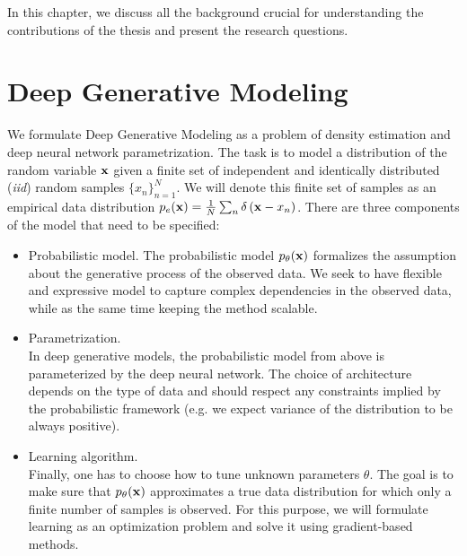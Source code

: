 In this chapter, we discuss all the background crucial for understanding the contributions of the thesis and present the research questions. 


\section{Deep Generative Modeling}
We formulate Deep Generative Modeling as a problem of density estimation and deep neural network parametrization. 
The task is to model a distribution of the random variable ${\mathbf{x}}$ given a finite set of independent and identically distributed (\textit{iid}) random samples $\{x_n\}_{n=1}^N$. 
We will denote this finite set of samples as an empirical data distribution $p_e({\mathbf{x}}) = \frac1N \sum_n \delta\left({\mathbf{x}} - x_n\right)$. 
There are three components of the model that need to be specified:
\begin{itemize}
\item Probabilistic model. \newline 
{}
The probabilistic model $p_{\theta}({\mathbf{x}})$ formalizes the assumption about the generative process of the observed data. 
We seek to have flexible and expressive model to capture complex dependencies in the observed data, while as the same time keeping the method scalable.


\item Parametrization.\\
In deep generative models, the probabilistic model from above is parameterized by the deep neural network. 
The choice of architecture depends on the type of data and should respect any constraints implied by the probabilistic framework (e.g. we expect variance of the distribution to be always positive).

\item Learning algorithm. \\
Finally, one has to choose how to tune unknown parameters $\theta$. The goal is to make sure that $p_{\theta}({\mathbf{x}})$ approximates a true data distribution for which only a finite number of samples is observed. For this purpose, we will formulate learning as an optimization problem and solve it using gradient-based methods. 
\end{itemize}

